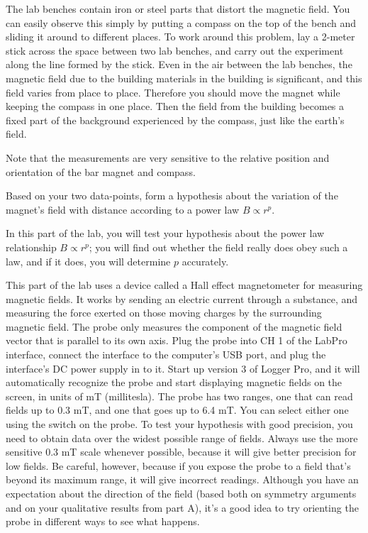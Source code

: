 The lab benches contain iron or steel parts that distort the magnetic field.
You can easily observe this simply by putting a compass on the top of the bench and sliding it around
to different places. To work around this problem, lay a 2-meter stick across the space between two
lab benches, and carry out the experiment along the line formed by the stick.
Even in the air between the lab benches, the magnetic field due to the building materials
in the building is significant, and this field varies from place to place.
Therefore you should move the magnet while keeping the compass in one place.
Then the field from the building becomes a fixed part of the background
experienced by the compass, just like the earth's field.

Note that the measurements are very sensitive to the
relative position and orientation of the bar magnet and
compass. 

Based on your two data-points, form a hypothesis about the variation
of the magnet's field with distance according to a power law $B\propto r^p$.


In this part of the lab, you will test your hypothesis about the power
law relationship $B\propto r^p$; you will find out whether the field really
does obey such a law, and if it does, you will determine $p$ accurately.

This part of the lab uses a device called a Hall effect magnetometer for
measuring magnetic fields.  It works by sending an electric current through a
substance, and measuring the force exerted on those moving charges by the surrounding
magnetic field. The probe only measures the component of the
magnetic field vector that is parallel to its own axis. Plug the probe into CH 1 of the
LabPro interface, connect the interface to the computer's USB port, and
plug the interface's DC power supply in to it. Start up version 3 of Logger Pro, and
it will automatically recognize the probe and start displaying magnetic fields
on the screen, in units of mT (millitesla). The probe has two ranges, one that can
read fields up to 0.3 mT, and one that goes up to 6.4 mT. You can select either one using the
switch on the probe. To test your hypothesis with good precision, you need to obtain
data over the widest possible range of fields. Always use the more sensitive 0.3 mT scale
whenever possible, because it will give better precision for low fields. Be careful,
however, because if you expose the probe to a field that's beyond its maximum range, it
will give incorrect readings. Although you have an expectation about the direction of the
field (based both on symmetry arguments and on your qualitative results from part A),
it's a good idea to try orienting the probe in different ways to see what happens.


